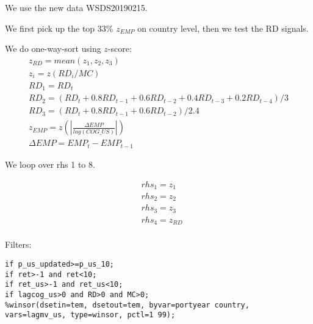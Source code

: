 

\usepackage[T1]{fontenc}




\thispagestyle{fancy}

\newcommand{\code}{\texttt}
\newcommand*{\Commonpath}{20190227/top33}


We use the new data WSDS20190215. 

We first pick up the top 33\% $z_{EMP}$ on country level, then we test the RD signals.


We do one-way-sort using $z$-score:
$$
\begin{aligned}
& z_{RD} = mean(z_1, z_2, z_3) \\
& z_i = z(RD_i/MC) \\
& RD_1 = RD_t \\
& RD_2 = (RD_t + 0.8RD_{t-1} + 0.6RD_{t-2} + 0.4RD_{t-3} + 0.2RD_{t-4})/3 \\
& RD_3 = (RD_t + 0.8RD_{t-1} + 0.6RD_{t-2})/2.4 
& \\
& z_{EMP} = z(|\frac{\Delta EMP}{lag(COG\_US)}|) \\
& \Delta EMP = EMP_t - EMP_{t-1}
\end{aligned}
$$


We loop over rhs 1 to 8.

$$
\begin{aligned}
& rhs_1 = z_1 \\
& rhs_2 = z_2 \\
& rhs_3 = z_3 \\
& rhs_4 = z_{RD} \\
\end{aligned}
$$ 


Filters:

\code{if p\_us\_updated>=p\_us\_10;} \\
\code{if ret>-1 and ret<10;} \\
\code{if ret\_us>-1 and ret\_us<10;} \\
\code{if lagcog\_us>0 and RD>0 and MC>0;} \\
\code{\%winsor(dsetin=tem, dsetout=tem, byvar=portyear country, vars=lagmv\_us, type=winsor, pctl=1 99);}

